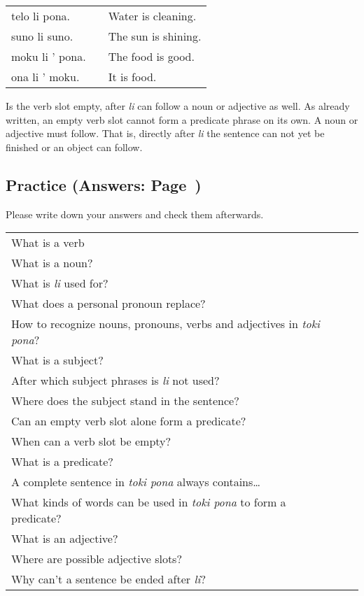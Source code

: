 \begin{supertabular}{p{5cm}|ll}
telo li pona. && Water is cleaning. \\
suno li suno. && The sun is shining. \\
moku li ' pona. && The food is good. \\ 
ona li ' moku. && It is food. \\
\end{supertabular} 

Is the verb slot empty, after \textit{li} can follow a noun or adjective as well. 
As already written, an empty verb slot cannot form a predicate phrase on its own. 
A noun or adjective must follow. 
That is, directly after \textit{li} the sentence can not yet be finished or an object can follow.

%
\newpage
\subsection*{Practice (Answers: Page~\pageref{'basic_sentences'})}
%
Please write down your answers and check them afterwards. 

\begin{supertabular}{p{5,5cm}|ll}
What is a verb &&  \\ %
What is a noun? &&   \\ %
What is \textit{li} used for?  &&   \\ %
What does a personal pronoun replace? &&  \\ %
How to recognize nouns, pronouns, verbs and adjectives in \textit{toki pona}? &&  \\ %
What is a subject?  &&   \\ %
After which subject phrases is \textit{li} not used?  &&  \\ %
Where does the subject stand in the sentence?  &&    \\ %
Can an empty verb slot alone form a predicate? &&    \\ %
When can a verb slot be empty?  &&     \\ %
What is a predicate?  &&     \\ %
A complete sentence in \textit{toki pona} always contains\dots  &&     \\ %
What kinds of words can be used in \textit{toki pona} to form a predicate? &&   \\ %
What is an adjective?  &&    \\ %
Where are possible adjective slots?  &&    \\  %
Why can't a sentence be ended after \textit{li}? &&  \\ %
\end{supertabular} 

